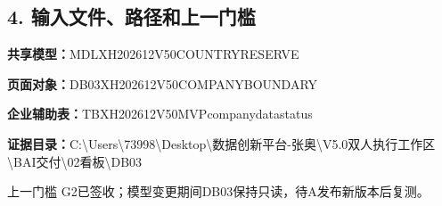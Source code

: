 \documentclass[UTF8,openany,zihao=-4]{ctexbook}
\renewcommand{\_}{\textunderscore\allowbreak}
\begin{document}
\subsection*{4. 输入文件、路径和上一门槛}
\noindent\textbf{共享模型：}{\promptlatin\promptcjk\small MDL\_\allowbreak{}XH202612\_\allowbreak{}V50\_\allowbreak{}COUNTRY\_\allowbreak{}RESERVE}\par
\noindent\textbf{页面对象：}{\promptlatin\promptcjk\small DB03\_\allowbreak{}XH202612\_\allowbreak{}V50\_\allowbreak{}COMPANY\_\allowbreak{}BOUNDARY}\par
\noindent\textbf{企业辅助表：}{\promptlatin\promptcjk\small TB\_\allowbreak{}XH202612\_\allowbreak{}V50\_\allowbreak{}MVP\_\allowbreak{}company\_\allowbreak{}data\_\allowbreak{}status}\par
\noindent\textbf{证据目录：}{\promptlatin\promptcjk\small C:\textbackslash{}\allowbreak{}Users\textbackslash{}\allowbreak{}73998\textbackslash{}\allowbreak{}Desktop\textbackslash{}\allowbreak{}数据创新平台-\allowbreak{}张奥\textbackslash{}\allowbreak{}V5.0\_\allowbreak{}双人执行工作区\textbackslash{}\allowbreak{}B\_\allowbreak{}AI交付\textbackslash{}\allowbreak{}02\_\allowbreak{}看板\textbackslash{}\allowbreak{}DB03}\par
\begin{gatebox}{上一门槛}
G2已签收；模型变更期间DB03保持只读，待A发布新版本后复测。

\end{gatebox}
\end{document}
